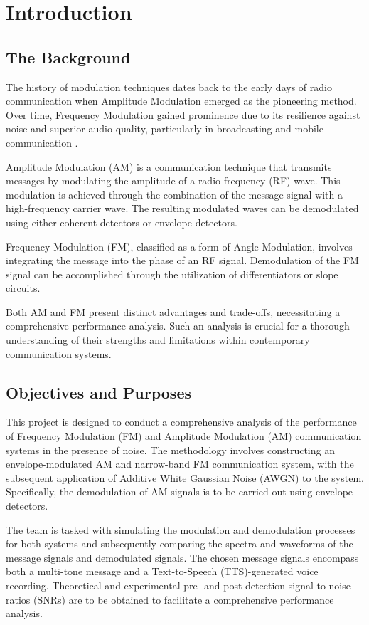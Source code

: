 \documentclass[../ECE459FinalProjectReport.tex]{subfiles}
\begin{document}
\chapter{Introduction}
\section{The Background}
The history of modulation techniques dates back to the early days of radio communication when Amplitude Modulation emerged as the pioneering method. Over time, Frequency Modulation gained prominence due to its resilience against noise and superior audio quality, particularly in broadcasting and mobile communication \cite[p. 152]{haykinIntroductionAnalogDigital2007}. 

Amplitude Modulation (AM) is a communication technique that transmits messages by modulating the amplitude of a radio frequency (RF) wave. This modulation is achieved through the combination of the message signal with a high-frequency carrier wave. The resulting modulated waves can be demodulated using either coherent detectors or envelope detectors.

Frequency Modulation (FM), classified as a form of Angle Modulation, involves integrating the message into the phase of an RF signal. Demodulation of the FM signal can be accomplished through the utilization of differentiators or slope circuits.

Both AM and FM present distinct advantages and trade-offs, necessitating a comprehensive performance analysis. Such an analysis is crucial for a thorough understanding of their strengths and limitations within contemporary communication systems.



\section{Objectives and Purposes}

This project is designed to conduct a comprehensive analysis of the performance of Frequency Modulation (FM) and Amplitude Modulation (AM) communication systems in the presence of noise. The methodology involves constructing an envelope-modulated AM and narrow-band FM communication system, with the subsequent application of Additive White Gaussian Noise (AWGN) to the system. Specifically, the demodulation of AM signals is to be carried out using envelope detectors.

The team is tasked with simulating the modulation and demodulation processes for both systems and subsequently comparing the spectra and waveforms of the message signals and demodulated signals. The chosen message signals encompass both a multi-tone message and a Text-to-Speech (TTS)-generated voice recording. Theoretical and experimental pre- and post-detection signal-to-noise ratios (SNRs) are to be obtained to facilitate a comprehensive performance analysis.
\end{document}
